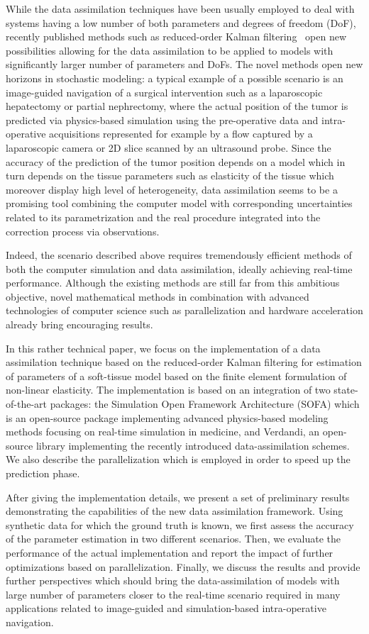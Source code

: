 While the data assimilation techniques have been usually employed to deal with systems having a low number of both parameters and degrees of freedom (DoF), recently published methods such as reduced-order Kalman filtering~\cite{moireau2011reduced} open new possibilities allowing for the data assimilation to be applied to models with significantly larger number of parameters and DoFs. The novel methods open new horizons in stochastic modeling: a typical example of a possible scenario is an image-guided navigation of a surgical intervention such as a laparoscopic hepatectomy or partial nephrectomy, where the actual position of the tumor is predicted via physics-based simulation using the pre-operative data and intra-operative acquisitions represented for example by a flow captured by a laparoscopic camera or 2D slice scanned by an ultrasound probe. Since the accuracy of the prediction of the tumor position depends on a model which in turn depends on the tissue parameters such as elasticity of the tissue which moreover display high level of heterogeneity, data assimilation seems to be a promising tool combining the computer model with corresponding uncertainties related to its parametrization and the real procedure integrated into the correction process via observations.

Indeed, the scenario described above requires tremendously efficient methods of both the computer simulation and data assimilation, ideally achieving real-time 
performance. Although the existing methods are still far from this ambitious objective, novel mathematical methods in combination with 
advanced technologies of computer science such as parallelization and hardware acceleration already bring encouraging results.  

In this rather technical paper, we focus on the implementation of a data assimilation technique based on the reduced-order Kalman filtering for estimation of parameters of a soft-tissue model based on the finite element formulation of non-linear elasticity. The implementation is based on an integration of two state-of-the-art packages: the Simulation Open Framework Architecture (SOFA) which is an open-source package implementing advanced physics-based modeling methods focusing on real-time simulation in medicine, and Verdandi, an open-source library implementing the recently introduced data-assimilation schemes. We also describe the parallelization which is employed in order to speed up the prediction phase.

After giving the implementation details, we present a set of preliminary results demonstrating the capabilities of the new data assimilation framework. Using 
synthetic data for which the ground truth is known, we first assess the accuracy of the parameter estimation in two different scenarios. Then, we evaluate the performance of the actual implementation and report the impact of further optimizations based on parallelization. Finally, we discuss the results and provide further perspectives which should bring the data-assimilation of models with large number of parameters closer to the real-time scenario required in many applications related to image-guided and simulation-based intra-operative navigation.
